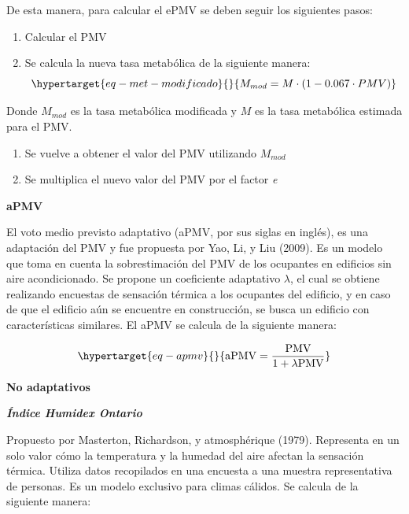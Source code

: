 \documentclass[
  12pt,
  letterpaper,
  DIV=11,
  numbers=noendperiod]{scrreport}
\providecommand{\tightlist}{%
  \setlength{\itemsep}{0pt}\setlength{\parskip}{0pt}}\usepackage{longtable,booktabs,array}
\begin{document}
De esta manera, para calcular el ePMV se deben seguir los siguientes
pasos:

\begin{enumerate}
\def\labelenumi{\arabic{enumi}.}
\tightlist
\item
  Calcular el PMV
\item
  Se calcula la nueva tasa metabólica de la siguiente manera:
  \begin{equation}\protect\hypertarget{eq-met-modificado}{}{
   M_{mod} = M \cdot (1 -0.067 \cdot PMV)
   }\label{eq-met-modificado}\end{equation}
\end{enumerate}

Donde \(M_{mod}\) es la tasa metabólica modificada y \(M\) es la tasa
metabólica estimada para el PMV.

\begin{enumerate}
\def\labelenumi{\arabic{enumi}.}
\setcounter{enumi}{2}
\tightlist
\item
  Se vuelve a obtener el valor del PMV utilizando \(M_{mod}\)
\item
  Se multiplica el nuevo valor del PMV por el factor \emph{e}
\end{enumerate}

\textbf{aPMV}

El voto medio previsto adaptativo (aPMV, por sus siglas en inglés), es
una adaptación del PMV y fue propuesta por Yao, Li, y Liu (2009). Es un
modelo que toma en cuenta la sobrestimación del PMV de los ocupantes en
edificios sin aire acondicionado. Se propone un coeficiente adaptativo
\(\lambda\), el cual se obtiene realizando encuestas de sensación
térmica a los ocupantes del edificio, y en caso de que el edificio aún
se encuentre en construcción, se busca un edificio con características
similares. El aPMV se calcula de la siguiente manera:

\begin{equation}\protect\hypertarget{eq-apmv}{}{ 
\text{aPMV} = \frac{\text{PMV}}{1 + \lambda \text{PMV}} 
}\label{eq-apmv}\end{equation}

\textbf{No adaptativos}

\textbf{\emph{Índice Humidex Ontario}}

Propuesto por Masterton, Richardson, y atmosphérique (1979). Representa
en un solo valor cómo la temperatura y la humedad del aire afectan la
sensación térmica. Utiliza datos recopilados en una encuesta a una
muestra representativa de personas. Es un modelo exclusivo para climas
cálidos. Se calcula de la siguiente manera:
\end{document}

